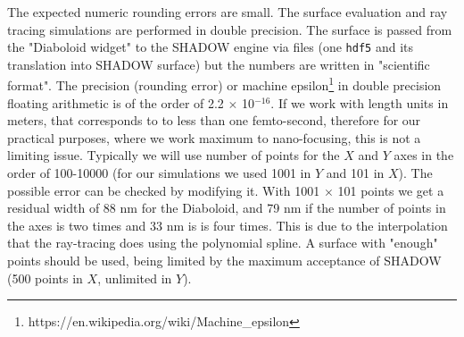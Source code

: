 \documentclass{iucr}              %
\begin{document}

 
The expected numeric rounding errors are small. The surface evaluation and ray tracing simulations are performed in double precision. The surface is passed from the "Diaboloid widget" to the SHADOW engine via files (one {\tt hdf5} and its translation into SHADOW surface) but the numbers are written in "scientific format". The precision (rounding error) or machine epsilon\footnote{ https://en.wikipedia.org/wiki/Machine\_epsilon} in double precision floating arithmetic is of the order of 2.2 $\times$ 10$^{-16}$. If we work with length units in meters, that corresponds to to less than one femto-second, therefore for our practical purposes, where we work maximum to nano-focusing, this is not a limiting issue. Typically we will use number of points for the $X$ and $Y$ axes in the order of 100-10000 (for our simulations we used 1001 in $Y$ and 101 in $X$). The possible error can be checked by modifying it. With 1001 $\times$ 101 points we get a residual width of 88 nm for the Diaboloid, and 79 nm if the number of points in the axes is two times and 33 nm is is four times. This is due to the interpolation that the ray-tracing does using the polynomial spline. A surface with "enough" points should be used, being limited by the maximum acceptance of SHADOW (500 points in $X$, unlimited in $Y$). 
\end{document}
